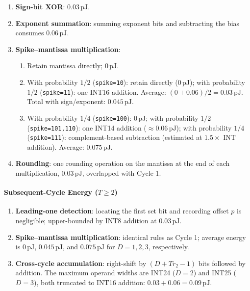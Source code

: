 \begin{enumerate}[label=(\arabic*)]
    \item \textbf{Sign-bit XOR}: $0.03\,\text{pJ}$.
    \item \textbf{Exponent summation}: summing exponent bits and subtracting the bias consumes $0.06\,\text{pJ}$.
    \item \textbf{Spike--mantissa multiplication}:
    \begin{enumerate}[label=\textit{D=\arabic*}:, leftmargin=*]
        \item Retain mantissa directly; $0\,\text{pJ}$.
        \item With probability $1/2$ (\texttt{spike=10}): retain directly ($0\,\text{pJ}$); with probability $1/2$ (\texttt{spike=11}): one INT16 addition. Average: $(0+0.06)/2 = 0.03\,\text{pJ}$. Total with sign/exponent: $0.045\,\text{pJ}$.
        \item With probability $1/4$ (\texttt{spike=100}): $0\,\text{pJ}$; with probability $1/2$ (\texttt{spike=101,110}): one INT14 addition ($\approx0.06\,\text{pJ}$); with probability $1/4$ (\texttt{spike=111}): complement-based subtraction (estimated at $1.5\times$ INT addition). Average: $0.075\,\text{pJ}$.
    \end{enumerate}
    \item \textbf{Rounding}: one rounding operation on the mantissa at the end of each multiplication, $0.03\,\text{pJ}$, overlapped with Cycle 1.
\end{enumerate}

\paragraph{Subsequent-Cycle Energy ($T \geq 2$)}

\begin{enumerate}[label=(\arabic*)]
    \item \textbf{Leading-one detection}: locating the first set bit and recording offset $p$ is negligible; upper-bounded by INT8 addition at $0.03\,\text{pJ}$.
    \item \textbf{Spike--mantissa multiplication}: identical rules as Cycle 1; average energy is $0\,\text{pJ}$, $0.045\,\text{pJ}$, and $0.075\,\text{pJ}$ for $D=1,2,3$, respectively.
    \item \textbf{Cross-cycle accumulation}: right-shift by $(D+Tr_2-1)$ bits followed by addition. The maximum operand widths are INT24 ($D=2$) and INT25 ($D=3$), both truncated to INT16 addition: $0.03+0.06=0.09\,\text{pJ}$.
\end{enumerate}

